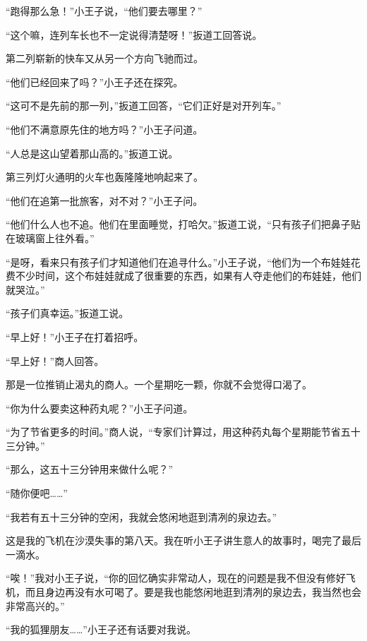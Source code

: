 “跑得那么急！”小王子说，“他们要去哪里？”

“这个嘛，连列车长也不一定说得清楚呀！”扳道工回答说。

第二列崭新的快车又从另一个方向飞驰而过。

“他们已经回来了吗？”小王子还在探究。

“这可不是先前的那一列，”扳道工回答，“它们正好是对开列车。”

“他们不满意原先住的地方吗？”小王子问道。

“人总是这山望着那山高的。”扳道工说。

第三列灯火通明的火车也轰隆隆地响起来了。

“他们在追第一批旅客，对不对？”小王子问。

“他们什么人也不追。他们在里面睡觉，打哈欠。”扳道工说，“只有孩子们把鼻子贴在玻璃窗上往外看。”

“是呀，看来只有孩子们才知道他们在追寻什么。”小王子说，“他们为一个布娃娃花费不少时间，这个布娃娃就成了很重要的东西，如果有人夺走他们的布娃娃，他们就哭泣。”

“孩子们真幸运。”扳道工说。


\stoptitle

\starttitle[title={23}]

“早上好！”小王子在打着招呼。

“早上好！”商人回答。

那是一位推销止渴丸的商人。一个星期吃一颗，你就不会觉得口渴了。

“你为什么要卖这种药丸呢？”小王子问道。

“为了节省更多的时间。”商人说，“专家们计算过，用这种药丸每个星期能节省五十三分钟。”

“那么，这五十三分钟用来做什么呢？”

“随你便吧\ldots{}\ldots{}”

“我若有五十三分钟的空闲，我就会悠闲地逛到清冽的泉边去。”


\stoptitle

\starttitle[title={24}]

这是我的飞机在沙漠失事的第八天。我在听小王子讲生意人的故事时，喝完了最后一滴水。

“唉！”我对小王子说，“你的回忆确实非常动人，现在的问题是我不但没有修好飞机，而且身边再没有水可喝了。要是我也能悠闲地逛到清冽的泉边去，我当然也会非常高兴的。”

“我的狐狸朋友\ldots{}\ldots{}”小王子还有话要对我说。

